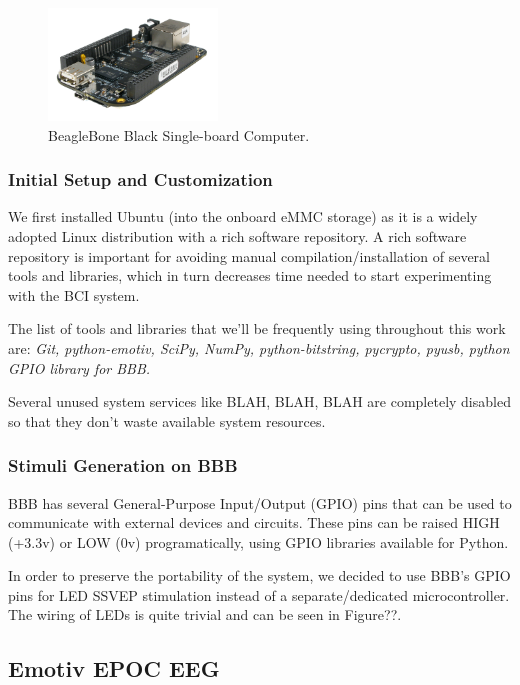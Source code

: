 \documentclass[12pt]{article}
\newcommand\mysubsection[1]{\subsection{#1}}
\newcommand\mysubsubsection[1]{\subsubsection{#1}}
\numberwithin{equation}{section}
\numberwithin{figure}{section}
\numberwithin{table}{section}
\begin{document}
\begin{figure}[ht]
    \centering
    \includegraphics[width=0.4\textwidth]{images/bbb}
    \caption{BeagleBone Black Single-board Computer.}
    \label{fig:bbb}
\end{figure}

\mysubsubsection{Initial Setup and Customization}\label{seq:embeddedcomputer_initialsetup}
\par{
We first installed Ubuntu (into the onboard eMMC storage) as it is a widely adopted Linux distribution with a rich software repository. A rich software repository is important for avoiding 
manual compilation/installation of several tools and libraries, which in turn decreases time needed to start experimenting with the BCI system.
}

\par{
The list of tools and libraries that we'll be frequently using throughout this work are: {\em Git, python-emotiv, SciPy, NumPy, python-bitstring, pycrypto, pyusb, python GPIO library for BBB.}
}

\par{
Several unused system services like BLAH, BLAH, BLAH are completely disabled so that they don't waste available system resources.
}

\mysubsubsection{Stimuli Generation on BBB}\label{seq:embeddedcomputer_stimuligen}
\par{
    BBB has several General-Purpose Input/Output (GPIO) pins that can be used 
    to communicate with external devices and circuits. These pins can be raised 
    HIGH (+3.3v) or LOW (0v) programatically, using GPIO libraries available for 
    Python.
}
\par{
    In order to preserve the portability of the system, we decided to use BBB's 
    GPIO pins for LED SSVEP stimulation instead of a separate/dedicated microcontroller. 
    The wiring of LEDs is quite trivial and can be seen in Figure??.
}



\mysubsection{Emotiv EPOC EEG}\label{seq:emotivepoceeg}
\end{document}
